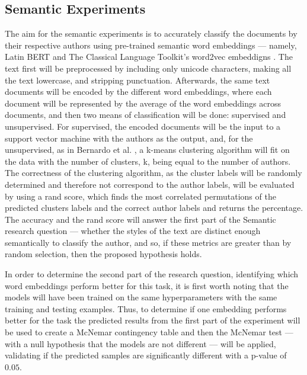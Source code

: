 \documentclass{csfourzero}
\begin{document}
\subsection{Semantic Experiments}
The aim for the semantic experiments is to accurately classify the documents by their respective authors using pre-trained semantic word embeddings --- namely, Latin BERT \cite{https://doi.org/10.48550/arxiv.2009.10053} and The Classical Language Toolkit's word2vec embeddigns \cite{johnson-etal-2021-classical}.
The text first will be preprocessed by including only unicode characters, making all the text lowercase, and stripping punctuation. Afterwards, the same text documents will be encoded by the different word embeddings, where each document will be represented by the average of the word embeddings across documents, and then two means of classification will be done: supervised and unsupervised. For supervised, the encoded documents will be the input to a support vector machine with the authors as the output, and, for the unsupervised, as in Bernardo et al. \cite{https://doi.org/10.48550/arxiv.2109.00601}, a k-means clustering algorithm will fit on the data with the number of clusters, k, being equal to the number of authors. The correctness of the clustering algorithm, as the cluster labels will be randomly determined and therefore not correspond to the author labels, will be evaluated by using a rand score, which finds the most correlated permutations of the predicted clusters labels and the correct author labels and returns the percentage. The accuracy and the rand score will answer the first part of the Semantic research question --- whether the styles of the text are distinct enough semantically to classify the author, and so, if these metrics are greater than by random selection, then the proposed hypothesis holds.

In order to determine the second part of the research question, identifying which word embeddings perform better for this task, it is first worth noting that the models will have been trained on the same hyperparameters with the same training and testing examples. Thus, to determine if one embedding performs better for the task the predicted results from the first part of the experiment will be used to create a McNemar contingency table and then the McNemar test  --- with a null hypothesis that the models are not different --- will be applied, validating if the predicted samples are significantly different with a p-value of $0.05$.
\end{document}

